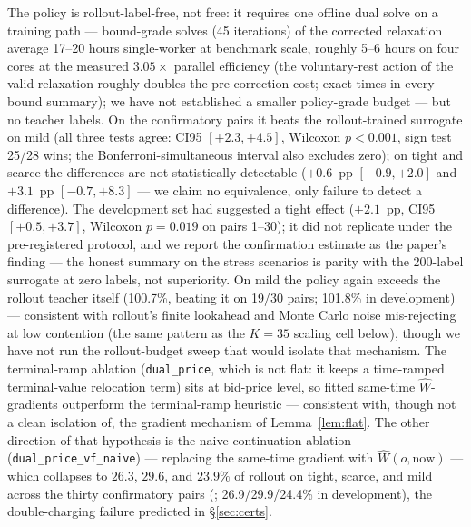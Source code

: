 \documentclass[11pt]{article}
\begin{document}
The policy is rollout-label-free, not free: it requires one offline
dual solve on a training path --- bound-grade solves (45 iterations)
of the corrected relaxation average 17--20 hours single-worker at
benchmark scale, roughly 5--6 hours on four cores at the measured
$3.05\times$ parallel efficiency (the voluntary-rest action of the
valid relaxation roughly doubles the pre-correction cost; exact times
in every bound summary); we have not established a smaller
policy-grade budget --- but no teacher labels. On the confirmatory
pairs it beats the rollout-trained surrogate on mild (all three
tests agree: CI95 $[+2.3, +4.5]$, Wilcoxon $p < 0.001$, sign test
25/28 wins; the Bonferroni-simultaneous interval also excludes
zero); on tight and scarce the differences are not statistically
detectable ($+0.6$~pp $[-0.9, +2.0]$ and $+3.1$~pp $[-0.7, +8.3]$
--- we claim no equivalence, only failure to detect a difference).
The development set had suggested a tight effect ($+2.1$~pp,
CI95 $[+0.5, +3.7]$, Wilcoxon $p = 0.019$ on pairs 1--30); it did
not replicate under the pre-registered protocol, and we report the
confirmation estimate as the paper's finding --- the honest summary
on the stress scenarios is parity with the 200-label surrogate at
zero labels, not superiority. On mild
the policy again exceeds the rollout teacher itself (100.7\%,
beating it on 19/30 pairs; 101.8\% in development) ---
consistent with rollout's finite lookahead and Monte Carlo noise
mis-rejecting at low contention (the same pattern as the $K{=}35$
scaling cell below), though we have not run the rollout-budget sweep
that would isolate that mechanism. The terminal-ramp ablation
(\texttt{dual\_price}, which is not flat: it keeps a time-ramped
terminal-value relocation term) sits at bid-price level, so fitted
same-time $\widehat{W}$-gradients outperform the terminal-ramp
heuristic --- consistent with, though not a clean isolation of, the
gradient mechanism of Lemma~\ref{lem:flat}. The other direction of that hypothesis
is the naive-continuation ablation
(\texttt{dual\_price\_vf\_naive}) --- replacing the same-time
gradient with $\widehat{W}(o, \mathrm{now})$ --- which collapses to
$26.3$, $29.6$, and $23.9\%$ of rollout on tight, scarce, and mild
across the thirty confirmatory pairs
(; 26.9/29.9/24.4\% in
development), the double-charging failure
predicted in \S\ref{sec:certs}.
\end{document}

